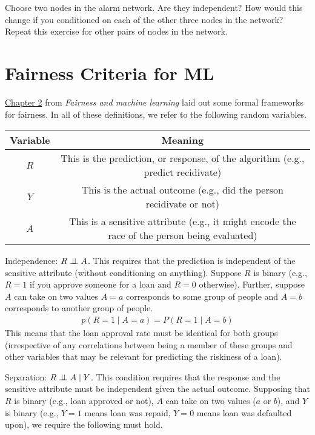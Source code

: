 \documentclass{tufte-handout}
\begin{document}
\begin{exercise}
Choose two nodes in the alarm network.  Are they independent?  How would this change if you conditioned on each of the other three nodes in the network?  Repeat this exercise for other pairs of nodes in the network.
\end{exercise}

\section{Fairness Criteria for ML}

\href{https://fairmlbook.org/classification.html}{Chapter 2} from \emph{Fairness and machine learning} laid out some formal frameworks for fairness.  In all of these definitions, we refer to the following random variables.

\vspace{1em}
\begin{tabular}{c | c}
\textbf{Variable} & \textbf{Meaning} \\
\hline
$R$ & This is the prediction, or response, of the algorithm (e.g., predict recidivate) \\
$Y$ & This is the actual outcome (e.g., did the person recidivate or not) \\
$A$ & This is a sensitive attribute (e.g., it might encode the race of the person being evaluated)
\end{tabular}


\bi
\item Independence: $R \perp\!\!\!\perp A$.  This requires that the prediction is independent of the sensitive attribute (without conditioning on anything).  Suppose $R$ is binary (e.g., $R=1$ if you approve someone for a loan and $R=0$ otherwise).  Further, suppose $A$ can take on two values $A=a$ corresponds to some group of people and $A=b$ corresponds to another group of people.
\begin{align}
p(R=1\mid A=a) = P(R=1 \mid A=b)
\end{align}
This means that the loan approval rate must be identical for both groups (irrespective of any correlations between being a member of these groups and other variables that may be relevant for predicting the riskiness of a loan).

\item Separation: $R \perp\!\!\!\perp A \mid Y$.  This condition requires that the response and the sensitive attribute must be independent given the actual outcome.  Supposing that $R$ is binary (e.g., loan approved or not), $A$ can take on two values ($a$ or $b$), and $Y$ is binary (e.g., $Y=1$ means loan was repaid, $Y=0$ means loan was defaulted upon), we require the following must hold.
\end{document}
